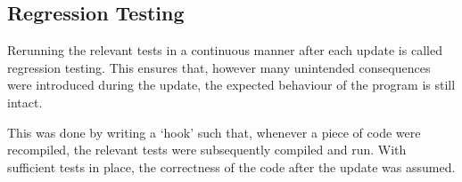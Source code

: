\subsection{Regression Testing}
\label{sec:RegressionTesting}

Rerunning the relevant tests in a continuous manner after each update is called regression testing. This ensures that, however many unintended consequences were introduced during the update, the expected behaviour of the program is still intact.

This was done by writing a `hook' such that, whenever a piece of code were recompiled, the relevant tests were subsequently compiled and run. With sufficient tests in place, the correctness of the code after the update was assumed.


